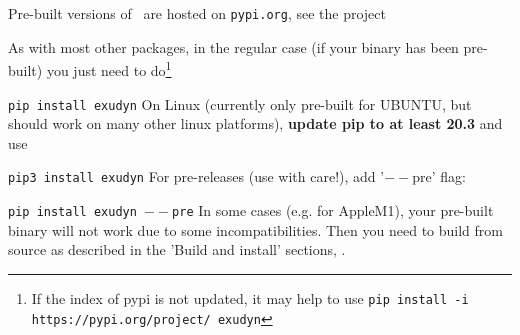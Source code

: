 Pre-built versions of \codeName\ are hosted on \texttt{pypi.org}, see the project
\bi
 \item {}
\ei
As with most other packages, in the regular case (if your binary has been pre-built) you just need to do\footnote{If the index of pypi is not updated, it may help to use \texttt{pip install -i https://pypi.org/project/ exudyn} }
\bi
  \item[] \texttt{pip install exudyn}
\ei
On Linux (currently only pre-built for UBUNTU, but should work on many other linux platforms), {\bf update pip to at least 20.3} and use 
\bi
  \item[] \texttt{pip3 install exudyn}
\ei
For pre-releases (use with care!), add '$--$pre' flag:
\bi
  \item[] \texttt{pip install exudyn $--$pre}
\ei
In some cases (e.g. for AppleM1), your pre-built binary will not work due to some incompatibilities. Then you need to build from source as described in the 'Build and install' sections, .
%

